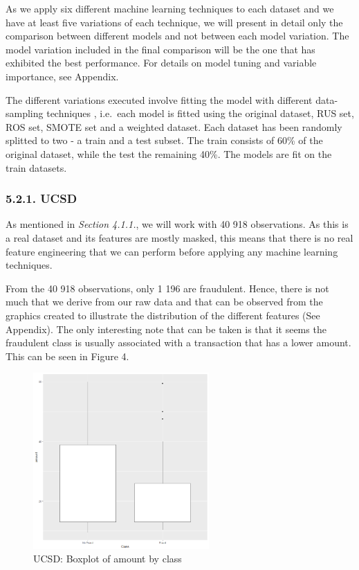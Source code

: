 \documentclass[12pt,]{article}
\begin{document}
As we apply six different machine learning techniques to each dataset
and we have at least five variations of each technique, we will present
in detail only the comparison between different models and not between
each model variation. The model variation included in the final
comparison will be the one that has exhibited the best performance. For
details on model tuning and variable importance, see Appendix.

The different variations executed involve fitting the model with
different data-sampling techniques , i.e.~each model is fitted using the
original dataset, RUS set, ROS set, SMOTE set and a weighted dataset.
Each dataset has been randomly splitted to two - a train and a test
subset. The train consists of 60\% of the original dataset, while the
test the remaining 40\%. The models are fit on the train datasets.

\hypertarget{ucsd}{%
\subsubsection{5.2.1. UCSD}\label{ucsd}}

As mentioned in \emph{Section 4.1.1.}, we will work with 40 918
observations. As this is a real dataset and its features are mostly
masked, this means that there is no real feature engineering that we can
perform before applying any machine learning techniques.

From the 40 918 observations, only 1 196 are fraudulent. Hence, there is
not much that we derive from our raw data and that can be observed from
the graphics created to illustrate the distribution of the different
features (See Appendix). The only interesting note that can be taken is
that it seems the fraudulent class is usually associated with a
transaction that has a lower amount. This can be seen in Figure 4.

\begin{figure}
\centering
\includegraphics[width=0.6\textwidth,height=\textheight]{figures/ucsd/descriptive/boxplot_amount.png}
\caption{UCSD: Boxplot of amount by class}
\end{figure}
\end{document}
